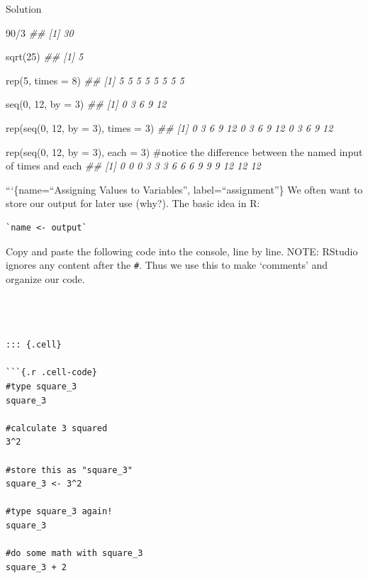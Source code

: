 \documentclass[
  letterpaper,
  DIV=11,
  numbers=noendperiod]{scrreprt}
\newenvironment{Shaded}{\begin{snugshade}}{\end{snugshade}}
\newcommand{\AttributeTok}[1]{\textcolor[rgb]{0.40,0.45,0.13}{#1}}
\newcommand{\CommentTok}[1]{\textcolor[rgb]{0.37,0.37,0.37}{#1}}
\newcommand{\DecValTok}[1]{\textcolor[rgb]{0.68,0.00,0.00}{#1}}
\newcommand{\DocumentationTok}[1]{\textcolor[rgb]{0.37,0.37,0.37}{\textit{#1}}}
\newcommand{\FunctionTok}[1]{\textcolor[rgb]{0.28,0.35,0.67}{#1}}
\newcommand{\NormalTok}[1]{\textcolor[rgb]{0.00,0.23,0.31}{#1}}
\newcommand{\SpecialCharTok}[1]{\textcolor[rgb]{0.37,0.37,0.37}{#1}}
\begin{document}
Solution

\begin{Shaded}
\begin{Highlighting}[]
\DecValTok{90}\SpecialCharTok{/}\DecValTok{3} 
\DocumentationTok{\#\# [1] 30}

\FunctionTok{sqrt}\NormalTok{(}\DecValTok{25}\NormalTok{)}
\DocumentationTok{\#\# [1] 5}

\FunctionTok{rep}\NormalTok{(}\DecValTok{5}\NormalTok{, }\AttributeTok{times =} \DecValTok{8}\NormalTok{)}
\DocumentationTok{\#\# [1] 5 5 5 5 5 5 5 5}

\FunctionTok{seq}\NormalTok{(}\DecValTok{0}\NormalTok{, }\DecValTok{12}\NormalTok{, }\AttributeTok{by =} \DecValTok{3}\NormalTok{)}
\DocumentationTok{\#\# [1]  0  3  6  9 12}

\FunctionTok{rep}\NormalTok{(}\FunctionTok{seq}\NormalTok{(}\DecValTok{0}\NormalTok{, }\DecValTok{12}\NormalTok{, }\AttributeTok{by =} \DecValTok{3}\NormalTok{), }\AttributeTok{times =}  \DecValTok{3}\NormalTok{)}
\DocumentationTok{\#\#  [1]  0  3  6  9 12  0  3  6  9 12  0  3  6  9 12}

\FunctionTok{rep}\NormalTok{(}\FunctionTok{seq}\NormalTok{(}\DecValTok{0}\NormalTok{, }\DecValTok{12}\NormalTok{, }\AttributeTok{by =} \DecValTok{3}\NormalTok{), }\AttributeTok{each =} \DecValTok{3}\NormalTok{) }\CommentTok{\#notice the difference between the named input of times and each}
\DocumentationTok{\#\#  [1]  0  0  0  3  3  3  6  6  6  9  9  9 12 12 12}
\end{Highlighting}
\end{Shaded}

```\{name=``Assigning Values to Variables'', label=``assignment''\} We
often want to store our output for later use (why?). The basic idea in
R:

\begin{verbatim}
`name <- output`
\end{verbatim}

Copy and paste the following code into the console, line by line. NOTE:
RStudio ignores any content after the \texttt{\#}. Thus we use this to
make `comments' and organize our code.

\begin{verbatim}



::: {.cell}

```{.r .cell-code}
#type square_3
square_3
    
#calculate 3 squared
3^2    
    
#store this as "square_3"
square_3 <- 3^2    
    
#type square_3 again!
square_3
    
#do some math with square_3
square_3 + 2
\end{verbatim}
\end{document}
